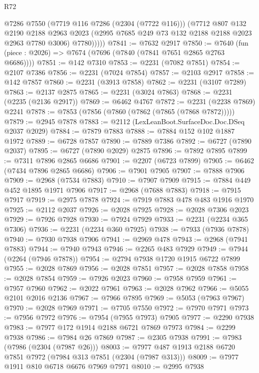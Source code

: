 \begin{lexlean}{R72}
\begin{coremodule}
            @7286
            @7550
            (@7719 @116 @7286 (@2304 (@7722 @116)))
            (@7712
              @807
              @132
              @2190
              @2188
              @2963
              @2023
              (@2995 @7685 @249 @73 @132 @2188 @2188 @2023 @2963 @7780 @3006)
              @7780)))))
@7841 := @7632 @2917
@7850 := @7640 (fun (piece : @2026) => @7674 (@7696 (@7840 (@7841 @7651 @2865 @2763 @6686))))
@7851 := @142 @7310
@7853 := @2231 (@7082 @7851)
@7854 := @2107 @7386
@7856 := @2231 (@7024 @7854)
@7857 := @2103 @2917
@7858 := @142 @7857
@7860 := @2231 (@3913 @7858)
@7862 := @2231 (@3107 @7289)
@7863 := @2137 @2875
@7865 := @2231 (@3024 @7863)
@7868 := @2231 (@2235 (@2136 @2917))
@7869 := @6462 @4767
@7872 := @2231 (@2238 @7869) @2241
@7878 := @7853 (@7856 (@7860 (@7862 (@7865 (@7868 @7872)))))
@7879 := @2945 @7878
@7883 := @2112 (LexLeanBoot.SurfaceDoc.Doc.DSeq @2037 @2029)
@7884 := @7879 @7883
@7888 := @7884 @152 @102 @1887 @1972
@7889 := @6728 @7857
@7890 := @7889 @7386
@7892 := @6727 (@7890 @2037)
@7895 := @6727 (@7890 @2029) @2875
@7896 := @7892 @7895
@7899 := @7311 @7896 @2865 @6686
@7901 := @2207 (@6723 @7899)
@7905 := @6462 (@7434 @7896 @2865 @6686)
@7906 := @7901 @7905
@7907 := @7888 @7906
@7909 := @2968 (@7534 @7883)
@7910 := @7907 @7909
@7915 := @7884 @449 @452 @1895 @1971 @7906
@7917 := @2968 (@7688 @7883)
@7918 := @7915 @7917
@7919 := @2975 @7878
@7924 := @7919 @7883 @478 @483 @1916 @1970
@7925 := @2112 @2037
@7926 := @2028 @7925
@7928 := @2028 @7306 @2023
@7929 := @7926 @7928
@7930 := @7924 @7929
@7933 := @2231 (@2234 @365 @7306)
@7936 := @2231 (@2234 @360 @7925)
@7938 := @7933 (@7936 @7878)
@7940 := @7930 @7938 @7906
@7941 := @2969 @478
@7943 := @2968 (@7941 @7883)
@7944 := @7940 @7943
@7946 := @2265 @483 @7929
@7949 := @7944 (@2264 (@7946 @7878))
@7954 := @2794 @7938 @1720 @1915 @6722 @7899
@7955 := @2028 @7869
@7956 := @2028 @7851
@7957 := @2028 @7858
@7958 := @2028 @7854
@7959 := @7926 @2023
@7960 := @7958 @7959
@7961 := @7957 @7960
@7962 := @2022 @7961
@7963 := @2028 @7962
@7966 := @5055 @2101 @2016 @2136
@7967 := @7966 @7895
@7969 := @5053 (@7963 @7967)
@7970 := @2028 @7969
@7971 := @7705 @7550
@7972 := @7970 @7971
@7973 := @7956 @7972
@7976 := @7954 (@7955 @7973) @7905
@7977 := @2290 @7938
@7983 := @7977 @172 @1914 @2188 @6721 @7869 @7973
@7984 := @2299 @7938
@7986 := @7984 @26 @7869
@7987 := @2305 @7938
@7991 := @7983 (@7986 (@2304 (@7987 @26)))
@8003 := @7977 @487 @1913 @2188 @6720 @7851 @7972 (@7984 @313 @7851 (@2304 (@7987 @313)))
@8009 := @7977 @1911 @810 @6718 @6676 @7969 @7971
@8010 := @2995 @7938

\end{coremodule}
\end{lexlean}
